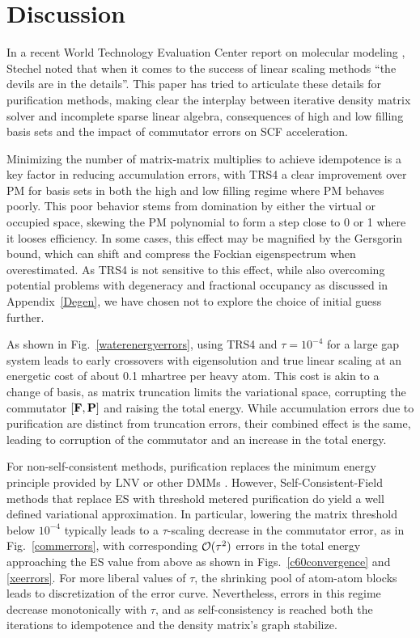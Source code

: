 \commentoutA{\documentclass[prb,aps,twocolumn,showpacs,twocolumngrid,superbib]{revtex4}}
\begin{document}
\section{Discussion}\label{discuss}

In a recent World Technology Evaluation Center report on molecular modeling \cite{WTECMM02}, 
Stechel noted that when it comes to the success of linear scaling  methods 
``the devils are in the details''.  This paper has tried to articulate these details for
purification methods, making clear the interplay between iterative density matrix solver and
incomplete sparse linear algebra, consequences of high and low filling basis sets and the 
impact of commutator errors on SCF acceleration. 

Minimizing the number of matrix-matrix multiplies to achieve idempotence is a key factor in reducing
accumulation errors, with TRS4 a clear improvement over PM for basis sets in both the high and 
low filling regime where PM behaves poorly.  This poor behavior stems from domination by 
either the virtual or occupied space, skewing the PM polynomial to form a step close to 0
or 1 where it looses efficiency.  In some cases, this effect may be magnified by the 
Gersgorin bound, which can shift and compress the Fockian eigenspectrum when overestimated.  As
TRS4 is not sensitive to this effect, while also overcoming potential problems with 
degeneracy and fractional occupancy as discussed in Appendix~\ref{Degen}, we have chosen not
to explore the choice of initial guess further.

As shown in Fig.~\ref{waterenergyerrors}, using TRS4 and $\tau=10^{-4}$ for a large gap system 
leads to  early crossovers with eigensolution and true linear scaling at an energetic 
cost of about 0.1 mhartree per heavy atom.  This cost is akin to a change of basis, 
as matrix truncation limits the variational space, corrupting the commutator $[{\bf F,P}]$ and 
raising the total energy.  While accumulation errors due to purification are distinct from 
truncation errors, their combined effect is the same, leading to corruption of the commutator 
and an increase in the total energy.   

For non-self-consistent methods,  purification replaces the minimum energy 
principle provided by LNV or other DMMs \cite{APalser98,DBowler99}.  However, Self-Consistent-Field methods 
that replace ES with threshold metered purification do yield a well defined variational approximation.  In particular, 
lowering the matrix threshold below $10^{-4}$ typically leads to a $\tau$-scaling decrease in the commutator 
error, as in Fig.~\ref{commerrors}, with corresponding ${\cal O}(\tau^2)$ errors in the total energy 
approaching  the ES value from above as shown in Figs.~\ref{c60convergence} and \ref{xeerrors}.  For more liberal  
values of $\tau$, the shrinking pool of atom-atom blocks leads to discretization of the error curve.  
Nevertheless, errors in this regime decrease monotonically with $\tau$, and as self-consistency 
is reached both the iterations to idempotence and the density matrix's graph stabilize.
\end{document}
